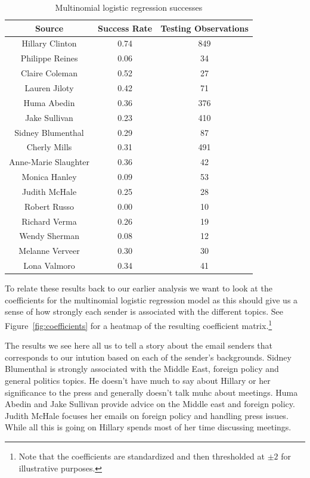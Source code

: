 \documentclass[12pt]{article}
\theoremstyle{definition}
\theoremstyle{algodesc}
\begin{document}
\begin{table}[htb] \centering
\begin{tabular}{ccc}
  \toprule
  Source & Success Rate & Testing Observations \\
  \midrule
  Hillary Clinton & 0.74 & 849 \\
  Philippe Reines & 0.06 & 34 \\
  Claire Coleman & 0.52 & 27 \\
  Lauren Jiloty & 0.42 & 71 \\
  Huma Abedin & 0.36 & 376 \\
  Jake Sullivan & 0.23 & 410 \\
  Sidney Blumenthal & 0.29 & 87 \\
  Cherly Mills & 0.31 & 491 \\
  Anne-Marie Slaughter & 0.36 & 42 \\
  Monica Hanley & 0.09 & 53 \\
  Judith McHale & 0.25 & 28 \\
  Robert Russo & 0.00 & 10 \\
  Richard Verma & 0.26 & 19 \\
  Wendy Sherman & 0.08 & 12 \\
  Melanne Verveer & 0.30 & 30 \\
  Lona Valmoro & 0.34 & 41 \\
  \bottomrule
\end{tabular}
\caption{Multinomial logistic regression successes}
\label{tab:mlr_success}
\end{table}

To relate these results back to our earlier analysis we want to look at the coefficients for the multinomial logistic regression model as this should give us a sense of how strongly each sender is associated with the different topics.  See Figure~\ref{fig:coefficients} for a heatmap of the resulting coefficient matrix.\footnote{Note that the coefficients are standardized and then thresholded at $\pm2$ for illustrative purposes.}

The results we see here all us to tell a story about the email senders that corresponds to our intution based on each of the sender's backgrounds.  Sidney Blumenthal is strongly associated with the Middle East, foreign policy and general politics topics.  He doesn't have much to say about Hillary or her significance to the press and generally doesn't talk muhc about meetings.  Huma Abedin and Jake Sullivan provide advice on the Middle east and foreign policy.  Judith McHale focuses her emails on foreign policy and handling press issues.  While all this is going on Hillary spends most of her time discussing meetings.
\end{document}
